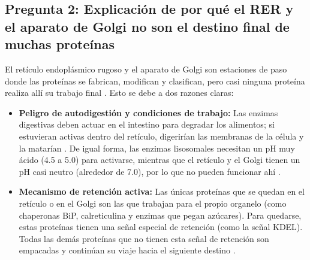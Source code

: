 \documentclass[spanish,letterpaper,oneside]{article}
\begin{document}
\subsection{Pregunta 2: Explicación de por qué el RER y el aparato de Golgi no son el destino final de muchas proteínas}
El retículo endoplásmico rugoso y el aparato de Golgi son estaciones de paso donde las proteínas se fabrican, modifican y clasifican, pero casi ninguna proteína realiza allí su trabajo final \parencite{lodish2021molecular}. Esto se debe a dos razones claras:
\begin{itemize}
    \item \textbf{Peligro de autodigestión y condiciones de trabajo:} Las enzimas digestivas deben actuar en el intestino para degradar los alimentos; si estuvieran activas dentro del retículo, digerirían las membranas de la célula y la matarían \parencite{kierszenbaum2020histologia}. De igual forma, las enzimas lisosomales necesitan un pH muy ácido (4.5 a 5.0) para activarse, mientras que el retículo y el Golgi tienen un pH casi neutro (alrededor de 7.0), por lo que no pueden funcionar ahí \parencite{lieberman2018marks}.
    \item \textbf{Mecanismo de retención activa:} Las únicas proteínas que se quedan en el retículo o en el Golgi son las que trabajan para el propio organelo (como chaperonas BiP, calreticulina y enzimas que pegan azúcares). Para quedarse, estas proteínas tienen una señal especial de retención (como la señal KDEL). Todas las demás proteínas que no tienen esta señal de retención son empacadas y continúan su viaje hacia el siguiente destino \parencite{alberts2022molecular, fortoul2020histologia}.
\end{itemize}
\end{document}
